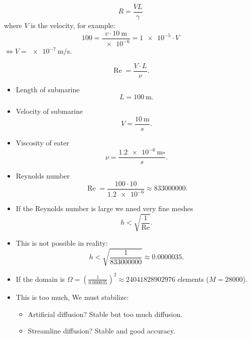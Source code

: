 \documentclass[
	a4paper,
	11pt,
	oneside
]{scrreprt}
\theoremstyle{definition}
\begin{document}
\[ R=\frac{VL}{\gamma} \] where $V$ is the velocity, for example: \[ 100=\frac{v\cdot\SI{10}{\meter}}{\num{e-6}}=\num{1e-5}\cdot V \] $\iff V=\SI{e-7}{\metre\per\second}$.

\[ \operatorname{Re}=\frac{V\cdot L}{\nu}. \]

\begin{itemize}
	\item Length of submarine \[ L=\SI{100}{\metre}. \]
	\item Velocity of submarine \[ V=\frac{\SI{10}{\metre}}s. \]
	\item Viscosity of eater \[ \nu=\frac{\SI{1.2e-6}{\metre\square}}{s}. \]
	\item Reynolds number \[ \operatorname{Re}=\frac{100\cdot 10}{\num{1.2e-6}}\approx833000000. \]
\end{itemize}

\begin{itemize}
\item If the Reynolds number is large we nned very fine meshes \[ h<\sqrt{\frac{1}{\mathrm{Re}}}. \]
\item This is not possible in reality: \[ h<\sqrt{\frac{1}{833000000}}\approx 0.0000035. \]
\item If the domain is $\Omega={\left(\frac{1}{0.000035}\right)}^{2}\approx 24041828902976$ elements ($M=28 000$).
\item This is too much, We must stabilize:
	\begin{itemize}
		\item Artificial diffusion? Stable but too much diffusion.
		\item Streamline diffusion? Stable and good accuracy.
	\end{itemize}
\end{itemize}
\end{document}

